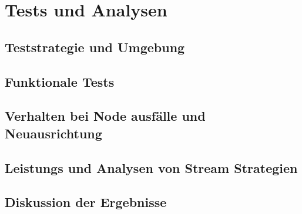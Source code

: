\chapter{Tests und Analysen}

\section{Teststrategie und Umgebung}

\section{Funktionale Tests}

\section{Verhalten bei Node ausfälle und Neuausrichtung}

\section{Leistungs und Analysen von Stream Strategien}

\section{Diskussion der Ergebnisse}